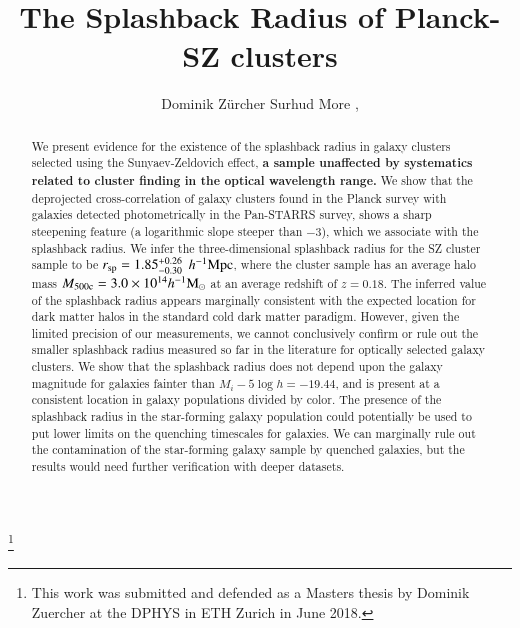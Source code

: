 \documentclass[iop, apjl, twocolappendix, numberedappendix]{emulateapj}
\def\mpch{h^{-1}{\rm Mpc}}
\def\msunh{h^{-1}{\rm M_{\odot}}}
\begin{document}
\title{The Splashback Radius of Planck-SZ clusters}

\thanks{This work was submitted and defended as a Masters thesis by Dominik
Zuercher at the DPHYS in ETH Zurich in June 2018.}

\author{
Dominik Zürcher 
Surhud More ,
}

\begin{abstract}
We present evidence for the existence of the splashback radius in galaxy
clusters selected using the Sunyaev-Zeldovich effect, {\bf a sample unaffected by
systematics related to cluster finding in the optical wavelength range.} We show
that the deprojected cross-correlation of galaxy clusters found in the Planck
survey with galaxies detected photometrically in the Pan-STARRS survey, shows a
sharp steepening feature (a logarithmic slope steeper than $-3$), which we
associate with the splashback radius. We infer the three-dimensional splashback
radius for the SZ cluster sample to be $r_{\rm sp}=1.85_{-0.30}^{+0.26}$
$\mpch$, where the cluster sample has an average halo mass $M_{\rm
500c}=3.0\times10^{14}\msunh$ at an average redshift of $z=0.18$. The inferred
value of the splashback radius appears marginally consistent with the expected location
for dark matter halos in the standard cold dark matter paradigm. However, given
the limited precision of our measurements, we cannot conclusively confirm or
rule out the smaller splashback radius measured so far in the literature for
optically selected galaxy clusters. We show that the splashback radius does not
depend upon the galaxy magnitude for galaxies fainter than $M_i-5\log
h=-19.44$, and is present at a consistent location in galaxy populations
divided by color. The presence of the splashback radius in the star-forming
galaxy population could potentially be used to put lower limits on the
quenching timescales for galaxies. We can marginally rule out the contamination
of the star-forming galaxy sample by quenched galaxies, but the results would
need further verification with deeper datasets.

\end{abstract}
\end{document}
